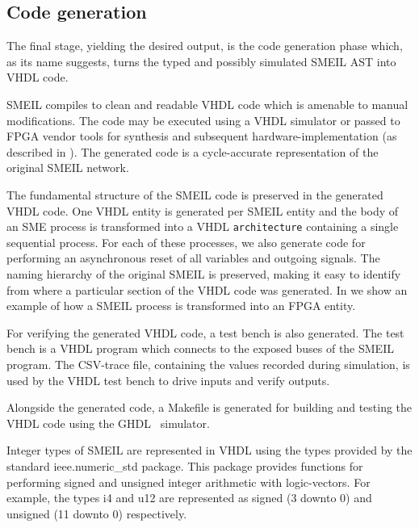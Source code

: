 \subsection{Code generation}
\label{sec:codegen}
The final stage, yielding the desired output, is the code generation phase
which, as its name suggests, turns the typed and possibly simulated SMEIL AST
into VHDL code.

SMEIL compiles to clean and readable VHDL code which is amenable to manual
modifications. The code may be executed using a VHDL simulator or passed to FPGA
vendor tools for synthesis and subsequent hardware-implementation (as described
in ). The generated code is a cycle-accurate representation of the
original SMEIL network.

The fundamental structure of the SMEIL code is preserved in the generated VHDL
code. One VHDL entity is generated per SMEIL entity and the body of an SME
process is transformed into a VHDL {\tt architecture} containing a single
sequential process. For each of these processes, we also generate code for
performing an asynchronous reset of all variables and outgoing
signals. The naming hierarchy of the original SMEIL is preserved, making it easy
to identify from where a particular section of the VHDL code was generated. In
 we show an example of how a SMEIL process is transformed
into an FPGA entity.

For verifying the generated VHDL code, a test bench is also generated. The
test bench is a VHDL program which connects to the {\ttfamily exposed} buses of
the SMEIL program. The CSV-trace file, containing the values recorded during
simulation, is used by the VHDL test bench to drive inputs and verify outputs.

Alongside the generated code, a {\ttfamily Makefile} is generated for building
and testing the VHDL code using the GHDL~\cite{ghdl} simulator.

Integer types of SMEIL are represented in VHDL using the types provided by the
standard {\ttfamily ieee.numeric\_std} package. This package provides functions
for performing signed and unsigned integer arithmetic with logic-vectors. For
example, the types {\ttfamily i4} and {\ttfamily u12} are represented as
{\ttfamily signed (3 downto 0)} and {\ttfamily unsigned (11 downto 0)}
respectively.

